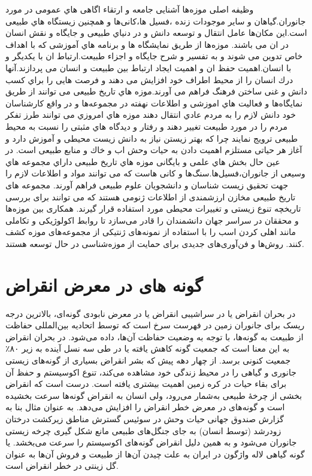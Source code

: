 وظیفه اصلی موزه‌ها آشنایی جامعه و ارتقاء اگاهی هاي عمومی در مورد جانوران.گیاهان و سایر موجودات زنده ،فسیل ها،کانی‌ها و همچنین  
زیستگاه هاي طبیعی است.این مکان‌ها عامل انتقال و توسعه دانش و در دنیاي طبیعی و جایگاه و نقش انسان در ان می باشند. موزه‌ها از طریق  
نمایشگاه ها و برنامه هاي آموزشی که با اهداف خاص تدوین می شوند و به تفسیر و شرح جایگاه و اجزاء طبیعت.ارتباط ان با یکدیگر و با انسان.اهمیت حفظ ان و اهمیت ایجاد ارتباط بین طبیعت و انسان می پردازند.آنها درك انسان را از محیط اطراف خود افزایش می دهند و فرصت هایی را براي کسب دانش و غنی ساختن فرهنگ فراهم می آورند.موزه هاي تاریخ طبیعی می توانند از طریق نمایگاه‌ها و فعالیت هاي اموزشی و اطلاعات نهفته در مجموعه‌ها و در واقع کارشناسان خود دانش لازم را به مردم عادي انتقال دهند موزه هاي امروزي می توانند طرز تفکر مردم را در  
مورد طبیعت تغییر دهند و رفتار و دیدگاه هاي مثبتی را نسبت به محیط طبیعی ترویج نمایند چرا که بهتر زیستن نیاز به دانش زیست محیطی و آموزش دارد و آغاز هر حیاتی مستلزم اهمیت دادن به حیات وحش اب و خاك و منابع طبیعی است. در عین حال بخش هاي علمی و بایگانی موزه هاي تاریخ طبیعی داراي مجموعه هاي وسیعی از جانوران،فسیل‌ها.سنگ‌ها و کانی هاست که می توانند مواد و اطلاعات لازم را جهت تحقیق  
زیست شناسان و دانشجویان علوم طبیعی فراهم آورند.
مجموعه های تاریخ طبیعی مخازن ارزشمندی از اطلاعات ژنومی هستند که می توانند برای بررسی تاریخچه تنوع زیستی و تغییرات محیطی مورد استفاده قرار گیرند. همکاری بین موزه‌ها و محققان در سراسر جهان دانشمندان را قادر می‌سازد تا روابط اکولوژیکی و تکاملی مانند اهلی کردن اسب را با استفاده از نمونه‌های ژنتیکی از مجموعه‌های موزه کشف کنند. روش‌ها و فن‌آوری‌های جدیدی برای حمایت از موزه‌شناسی در حال توسعه هستند.

\section{گونه های در معرض انقراض}
در بحران انقراض یا در سراشیبی انقراض یا در معرض نابودی گونه‌ای، بالاترین درجه ریسک برای جانوران زمین در فهرست سرخ  است که توسط اتحادیه بین‌المللی حفاظت از طبیعت به گونه‌ها، با توجه به وضعیت حفاظت آن‌ها، داده می‌شود. در بحران انقراض به این معنا است که جمعیت گونه کاهش یافته یا در طی سه نسل آینده به زیر ۸۰٪ جمعیت کنونی برسد.
از چهار دهه پیش که بشر انقراض بسیاری از گونه‌های زیستی جانوری و گیاهی را در محیط زندگی خود مشاهده می‌کند، تنوع اکوسیستم و حفظ آن برای بقاء حیات در کره زمین اهمیت بیشتری یافته است.
درست است که انقراض بخشی از چرخهٔ طبیعی به‌شمار می‌رود، ولی انسان به انقراض گونه‌ها سرعت بخشیده است و گونه‌های در معرض خطر انقراض را افزایش می‌دهد. به عنوان مثال بنا به گزارش صندوق جهانی حیات وحش در سوئیس گسترش مناطق زیرکشت درختان زودرشد (توسط انسان) به جای جنگل‌های طبیعی مانع شکل گیری چرخه زیستی جانوران می‌شود و به همین دلیل انقراض گونه‌های اکوسیستم را سرعت می‌بخشد.
 یا گونه گیاهی لاله واژگون در ایران به علت چیدن آن‌ها از طبیعت و فروش آن‌ها به عنوان گل زینتی در خطر انقراض است.

